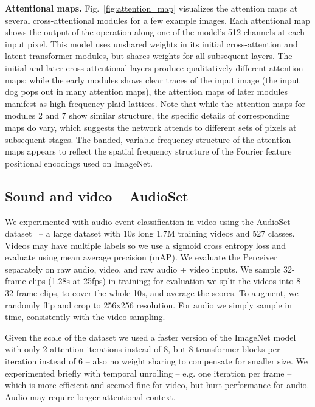 \documentclass{article}
\begin{document}
\noindent \textbf{Attentional maps.} Fig.~\ref{fig:attention_map} visualizes the attention maps at several cross-attentional modules for a few example images. Each attentional map shows the output of the  operation along one of the model's 512 channels at each input pixel. This model uses unshared weights in its initial cross-attention and latent transformer modules, but shares weights for all subsequent layers. The initial and later cross-attentional layers produce qualitatively different attention maps: while the early modules shows clear traces of the input image (the input dog pops out in many attention maps), the attention maps of later modules manifest as high-frequency plaid lattices. Note that while the attention maps for modules 2 and 7 show similar structure, the specific details of corresponding maps do vary, which suggests the network attends to different sets of pixels at subsequent stages. The banded, variable-frequency structure of the attention maps appears to reflect the spatial frequency structure of the Fourier feature positional encodings used on ImageNet.

\subsection{Sound and video -- AudioSet}

We experimented with audio event classification in video using the AudioSet dataset~\cite{gemmeke2017audio} -- a large dataset with 10s long 1.7M training videos and 527 classes. Videos may have multiple labels so we use a sigmoid cross entropy loss and evaluate using mean average precision (mAP). We evaluate the Perceiver separately on raw audio, video, and raw audio + video inputs. We sample 32-frame clips (1.28s at 25fps) in training; for evaluation we split the videos into 8 32-frame clips, to cover the whole 10s, and average the scores. To augment, we randomly flip and crop to 256x256 resolution. For audio we simply sample in time, consistently with the video sampling.

Given the scale of the dataset we used a faster version of the ImageNet model with only 2 attention iterations instead of 8, but 8 transformer blocks per iteration instead of 6 -- also no weight sharing to compensate for smaller size. We experimented briefly with temporal unrolling -- e.g. one iteration per frame -- which is more efficient and seemed fine for video, but hurt performance for audio. Audio may require longer attentional context.
\end{document}
